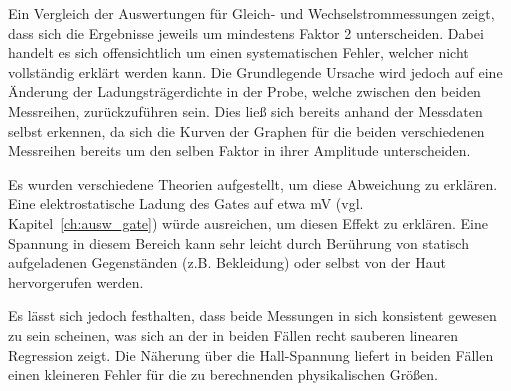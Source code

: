 
Ein Vergleich der Auswertungen für Gleich- und Wechselstrommessungen zeigt, dass sich die Ergebnisse jeweils um mindestens Faktor 2 unterscheiden. Dabei handelt es sich offensichtlich um einen systematischen Fehler, welcher nicht vollständig erklärt werden kann. Die Grundlegende Ursache wird jedoch auf eine Änderung der Ladungsträgerdichte in der Probe, welche zwischen den beiden Messreihen, zurückzuführen sein. Dies ließ sich bereits anhand der Messdaten selbst erkennen, da sich die Kurven der Graphen für die beiden verschiedenen Messreihen bereits um den selben Faktor in ihrer Amplitude unterscheiden.

Es wurden verschiedene Theorien aufgestellt, um diese Abweichung zu erklären. Eine elektrostatische Ladung des Gates auf etwa \unit[100]{mV} (vgl. Kapitel~\ref{ch:ausw_gate}) würde ausreichen, um diesen Effekt zu erklären. Eine Spannung in diesem Bereich kann sehr leicht durch Berührung von statisch aufgeladenen Gegenständen (z.B. Bekleidung) oder selbst von der Haut hervorgerufen werden.

Es lässt sich jedoch festhalten, dass beide Messungen in sich konsistent gewesen zu sein scheinen, was sich an der in beiden Fällen recht sauberen linearen Regression zeigt. Die Näherung über die Hall-Spannung liefert in beiden Fällen einen kleineren Fehler für die zu berechnenden physikalischen Größen. 



